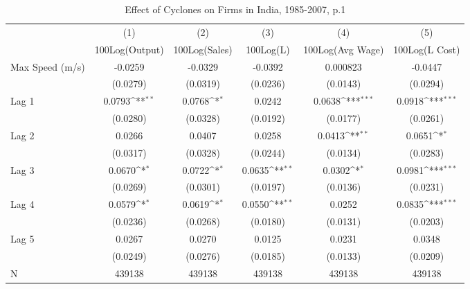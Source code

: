 \begin{table}[htbp]\centering
\def\sym#1{\ifmmode^{#1}\else\(^{#1}\)\fi}
\caption{Effect of Cyclones on Firms in India, 1985-2007, p.1}
\begin{tabular}{l*{5}{c}}
\toprule
                &\multicolumn{1}{c}{(1)}&\multicolumn{1}{c}{(2)}&\multicolumn{1}{c}{(3)}&\multicolumn{1}{c}{(4)}&\multicolumn{1}{c}{(5)}\\
                &\multicolumn{1}{c}{100Log(Output)}&\multicolumn{1}{c}{100Log(Sales)}&\multicolumn{1}{c}{100Log(L)}&\multicolumn{1}{c}{100Log(Avg Wage)}&\multicolumn{1}{c}{100Log(L Cost)}\\
\midrule
Max Speed (m/s) &  -0.0259         &  -0.0329         &  -0.0392         & 0.000823         &  -0.0447         \\
                & (0.0279)         & (0.0319)         & (0.0236)         & (0.0143)         & (0.0294)         \\
\addlinespace
Lag 1           &   0.0793\sym{**} &   0.0768\sym{*}  &   0.0242         &   0.0638\sym{***}&   0.0918\sym{***}\\
                & (0.0280)         & (0.0328)         & (0.0192)         & (0.0177)         & (0.0261)         \\
\addlinespace
Lag 2           &   0.0266         &   0.0407         &   0.0258         &   0.0413\sym{**} &   0.0651\sym{*}  \\
                & (0.0317)         & (0.0328)         & (0.0244)         & (0.0134)         & (0.0283)         \\
\addlinespace
Lag 3           &   0.0670\sym{*}  &   0.0722\sym{*}  &   0.0635\sym{**} &   0.0302\sym{*}  &   0.0981\sym{***}\\
                & (0.0269)         & (0.0301)         & (0.0197)         & (0.0136)         & (0.0231)         \\
\addlinespace
Lag 4           &   0.0579\sym{*}  &   0.0619\sym{*}  &   0.0550\sym{**} &   0.0252         &   0.0835\sym{***}\\
                & (0.0236)         & (0.0268)         & (0.0180)         & (0.0131)         & (0.0203)         \\
\addlinespace
Lag 5           &   0.0267         &   0.0270         &   0.0125         &   0.0231         &   0.0348         \\
                & (0.0249)         & (0.0276)         & (0.0185)         & (0.0133)         & (0.0209)         \\
\midrule
N               &   439138         &   439138         &   439138         &   439138         &   439138         \\

\end{tabular}
\end{table}
